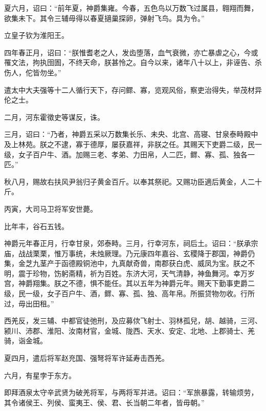 \documentclass[12pt,UTF8]{ctexbook}
\begin{document}
夏六月，诏曰：“前年夏，神爵集雍。今春，五色鸟以万数飞过属县，翱翔而舞，欲集未下。其令三辅毋得以春夏擿巢探卵，弹射飞鸟。具为令。”



立皇子钦为淮阳王。



四年春正月，诏曰：“朕惟耆老之人，发齿堕落，血气衰微，亦亡暴虐之心，今或罹文法，拘执囹圄，不终天命，朕甚怜之。自今以来，诸年八十以上，非诬告、杀伤人，佗皆勿坐。”



遣太中大夫强等十二人循行天下，存问鳏、寡，览观风俗，察吏治得失，举茂材异伦之士。



二月，河东霍徵史等谋反，诛。



三月，诏曰：“乃者，神爵五采以万数集长乐、未央、北宫、高寝、甘泉泰畤殿中及上林苑。朕之不逮，寡于德厚，屡获嘉祥，非朕之任。其赐天下吏爵二级，民一级，女子百户牛、酒。加赐三老、孝弟、力田帛，人二匹，鳏、寡、孤、独各一匹。”



秋八月，赐故右扶风尹翁归子黄金百斤。以奉其祭祀。又赐功臣適后黄金，人二十斤。



丙寅，大司马卫将军安世薨。



比年丰，谷石五钱。



神爵元年春正月，行幸甘泉，郊泰畤。三月，行幸河东，祠后土。诏曰：“朕承宗庙，战战栗栗，惟万事统，未烛厥理。乃元康四年嘉谷、玄稷降于郡国，神爵仍集，金芝九茎产于函德殿铜池中，九真献奇兽，南郡获白虎、威凤为宝。朕之不明，震于珍物，饬躬斋精，祈为百姓。东济大河，天气清静，神鱼舞河。幸万岁宫，神爵翔集。朕之不德，惧不能任。其以五年为神爵元年。赐天下勤事吏爵二级，民一级，女子百户牛、酒，鳏、寡、孤、独、高年帛。所振贷物勿收。行所过，毋出田租。”



西羌反，发三辅、中都官徒弛刑，及应募佽飞射士、羽林孤兒，胡、越骑，三河、颍川、沛郡、淮阳、汝南材官，金城、陇西、天水、安定、北地、上郡骑士、羌骑，诣金城。



夏四月，遣后将军赵充国、强弩将军许延寿击西羌。



六月，有星孛于东方。



即拜酒泉太守辛武贤为破羌将军，与两将军并进。诏曰：“军旅暴露，转输烦劳，其令诸侯王、列侯、蛮夷王、侯、君、长当朝二年者，皆毋朝。”
\end{document}
